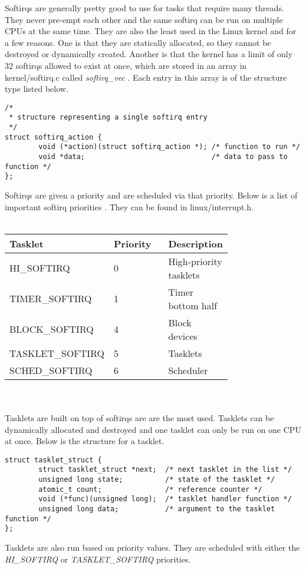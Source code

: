 \documentclass[10pt,draftclsnofoot,onecolumn,journal,compsoc]{IEEEtran}
\begin{document}
Softirqs are generally pretty good to use for tasks that require many threads. They never pre-empt each other and the same softirq can be run on multiple CPUs at the same time. They are also the least used in the Linux kernel and for a few reasons. One is that they are statically allocated, so they cannot be destroyed or dynamically created. Another is that the kernel has a limit of only 32 softirqs allowed to exist at once, which are stored in an array in kernel/softirq.c called \textit{softirq\_vec} \cite{linux}. Each entry in this array is of the structure type listed below.
\begin{lstlisting}[caption={The \textit{softirq\_action} structure in the linux/interrupt.h file.}]
/*
 * structure representing a single softirq entry
 */
struct softirq_action {
        void (*action)(struct softirq_action *); /* function to run */
        void *data;                              /* data to pass to function */
};
\end{lstlisting}
Softirqs are given a priority and are scheduled via that priority. Below is a list of important softirq priorities \cite{linux}. They can be found in linux/interrupt.h. \\ \\
\begin{tabular}{ | p{0.25\linewidth} | p{0.25\linewidth} | p{0.25\linewidth} | }
    \hline
Tasklet & Priority & Description \\ \hline
HI\_SOFTIRQ & 0 & High-priority tasklets \\ \hline
TIMER\_SOFTIRQ & 1 & Timer bottom half \\ \hline
BLOCK\_SOFTIRQ & 4 & Block devices \\ \hline
TASKLET\_SOFTIRQ & 5 & Tasklets \\ \hline
SCHED\_SOFTIRQ & 6 & Scheduler \\ \hline
\end{tabular} \\ \\ 
Tasklets are built on top of softirqs are are the most used. Tasklets can be dynamically allocated and destroyed and one tasklet can only be run on one CPU at once. Below is the structure for a tasklet.

\begin{lstlisting}[caption={The \textit{tasklet\_struct} structure in the linux/interrupt.h file.}]
struct tasklet_struct {
        struct tasklet_struct *next;  /* next tasklet in the list */
        unsigned long state;          /* state of the tasklet */
        atomic_t count;               /* reference counter */
        void (*func)(unsigned long);  /* tasklet handler function */
        unsigned long data;           /* argument to the tasklet function */
};
\end{lstlisting}
Tasklets are also run based on priority values. They are scheduled with either the \textit{HI\_SOFTIRQ} or \textit{TASKLET\_SOFTIRQ} priorities. 
\end{document}
